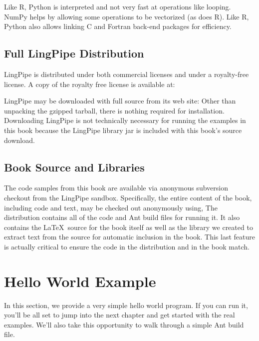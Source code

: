 Like R, Python is interpreted and not very fast at operations like
looping.  NumPy helps by allowing some operations to be vectorized (as
does R).  Like R, Python also allows linking C and Fortran back-end
packages for efficiency.

\subsection{Full LingPipe Distribution}

LingPipe is distributed under both commercial licenses
and under a royalty-free license.  A copy of the royalty free
license is available at:
%

LingPipe may be downloaded with full source from its web site:
%
%
Other than unpacking the gzipped tarball, there is nothing required
for installation.  Downloading LingPipe is not technically necessary for
running the examples in this book because the LingPipe library jar is
included with this book's source download.


\subsection{Book Source and Libraries}

The code samples from this book are available via anonymous subversion checkout
from the LingPipe sandbox.  Specifically, the entire content of the book,
including code and text, may be checked out anonymously using,
%
%
The distribution contains all of the code and Ant build files for
running it.  It also contains the \LaTeX\ source for the book itself
as well as the library we created to extract text from the source for
automatic inclusion in the book.  This last feature is actually
critical to ensure the code in the distribution and in the book match.  


\section{Hello World Example}

In this section, we provide a very simple hello world program.  If you
can run it, you'll be all set to jump into the next chapter and get
started with the real examples.  We'll also take this opportunity to
walk through a simple Ant build file.

